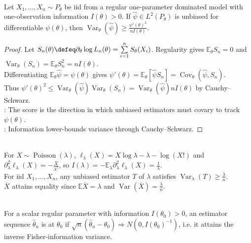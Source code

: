 \begin{theorem} \label{thm:cramer-rao-bound} \\
Let $X_1,\ldots,X_n\sim P_\theta$ be iid from a regular one-parameter dominated model with one-observation information $I(\theta)>0$. If $\widehat{\psi}\in L^2(P_\theta)$ is unbiased for differentiable $\psi(\theta)$, then $\operatorname{Var}_\theta(\widehat{\psi})\geq \frac{\psi'(\theta)^2}{nI(\theta)}$.
\begin{proof}
Let $S_n(\theta)\defeq\partial_\theta\log L_n(\theta)=\sum\limits_{i=1}^{n}S_\theta(X_i)$. Regularity gives $\mathbb{E}_\theta S_n=0$ and $\operatorname{Var}_\theta(S_n)=\mathbb{E}_\theta S_n^2=nI(\theta)$.\\
Differentiating $\mathbb{E}_\theta\widehat{\psi}=\psi(\theta)$ gives $\psi'(\theta)=\mathbb{E}_\theta[\widehat{\psi}S_n]=\operatorname{Cov}_\theta(\widehat{\psi},S_n)$.\\
Thus $\psi'(\theta)^2\leq\operatorname{Var}_\theta(\widehat{\psi})\operatorname{Var}_\theta(S_n)=\operatorname{Var}_\theta(\widehat{\psi})nI(\theta)$ by Cauchy--Schwarz.\\
: The score is the direction in which unbiased estimators must covary to track $\psi(\theta)$.\\
: Information lower-bounds variance through Cauchy--Schwarz.
\end{proof}
\end{theorem}

\begin{example} \label{ex:poisson-cramer-rao-attainment} \\
For $X\sim\operatorname{Poisson}(\lambda)$, $\ell_\lambda(X)=X\log\lambda-\lambda-\log(X!)$ and $\partial_\lambda^2\ell_\lambda(X)=-\frac{X}{\lambda^2}$, so $I(\lambda)=-\mathbb{E}_\lambda\partial_\lambda^2\ell_\lambda(X)=\frac{1}{\lambda}$.\\
For iid $X_1,\ldots,X_n$, any unbiased estimator $T$ of $\lambda$ satisfies $\operatorname{Var}_\lambda(T)\geq\frac{\lambda}{n}$.\\
$\overline{X}$ attains equality since $\mathbb{E}\overline{X}=\lambda$ and $\operatorname{Var}(\overline{X})=\frac{\lambda}{n}$.
\end{example}

\begin{definition} \label{def:asymptotic-efficiency} \\
For a scalar regular parameter with information $I(\theta_0)>0$, an estimator sequence $\widehat{\theta}_n$ is  at $\theta_0$ if $\sqrt{n}(\widehat{\theta}_n-\theta_0)\Rightarrow N(0,I(\theta_0)^{-1})$, i.e. it attains the inverse Fisher-information variance.
\end{definition}


